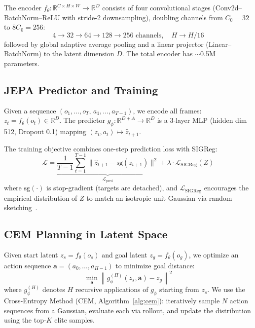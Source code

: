 \documentclass[10pt,twocolumn,letterpaper]{article}
\begin{document}
The encoder $f_\theta: \mathbb{R}^{C \times H \times W} \to \mathbb{R}^D$
consists of four convolutional stages (Conv2d--BatchNorm--ReLU with
stride-2 downsampling), doubling channels from $C_0{=}32$ to $8C_0{=}256$:
\begin{equation*}
  4 \!\to\! 32 \!\to\! 64 \!\to\! 128 \!\to\! 256 \text{ channels},
  \quad H \!\to\! H/16
\end{equation*}
followed by global adaptive average pooling and a linear projector
(Linear--BatchNorm) to the latent dimension $D$. The total encoder has
${\sim}$0.5M parameters.

\subsection{JEPA Predictor and Training}

Given a sequence $(o_1,\ldots,o_T,\, a_1,\ldots,a_{T-1})$, we encode all
frames: $z_t = f_\theta(o_t) \in \mathbb{R}^D$.
The predictor $g_\phi: \mathbb{R}^{D+A} \to \mathbb{R}^D$ is a 3-layer
MLP (hidden dim 512, Dropout 0.1) mapping $(z_t, a_t) \mapsto \hat{z}_{t+1}$.

The training objective combines one-step prediction loss with SIGReg:
\begin{equation}
  \mathcal{L} = \underbrace{\frac{1}{T{-}1}\sum_{t=1}^{T-1}
    \|\hat{z}_{t+1} - \mathrm{sg}(z_{t+1})\|^2}_{\mathcal{L}_\text{pred}}
  + \lambda \cdot \mathcal{L}_\text{SIGReg}(Z)
  \label{eq:loss}
\end{equation}
where $\mathrm{sg}(\cdot)$ is stop-gradient (targets are detached), and
$\mathcal{L}_\text{SIGReg}$ encourages the empirical distribution of $Z$
to match an isotropic unit Gaussian via random sketching~\cite{balestriero2024lejepa}.

\subsection{CEM Planning in Latent Space}

Given start latent $z_s = f_\theta(o_s)$ and goal latent
$z_g = f_\theta(o_g)$, we optimize an action sequence
$\mathbf{a} = (a_0,\ldots,a_{H-1})$ to minimize goal distance:
\begin{equation}
  \min_{\mathbf{a}} \left\|
    g_\phi^{(H)}(z_s, \mathbf{a}) - z_g
  \right\|^2
\end{equation}
where $g_\phi^{(H)}$ denotes $H$ recursive applications of $g_\phi$
starting from $z_s$.
We use the Cross-Entropy Method (CEM, Algorithm~\ref{alg:cem}):
iteratively sample $N$ action sequences from a Gaussian, evaluate each
via rollout, and update the distribution using the top-$K$ elite samples.
\end{document}
